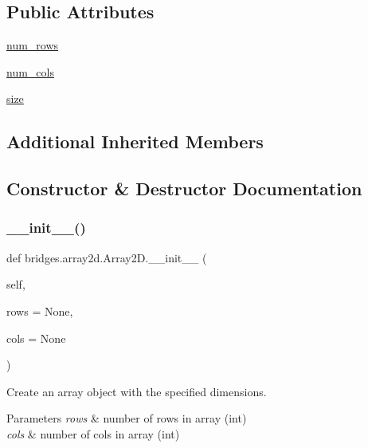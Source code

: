 \subsection*{Public Attributes}
\begin{DoxyCompactItemize}
\item 
\hyperlink{classbridges_1_1array2d_1_1_array2_d_a45ad2f76ebf188ea726f7b573282cc5a}{num\+\_\+rows}
\item 
\hyperlink{classbridges_1_1array2d_1_1_array2_d_ab141dadc82b84fe9fae4bfbd664521b0}{num\+\_\+cols}
\item 
\hyperlink{classbridges_1_1array2d_1_1_array2_d_aabdeff1615fd9909c8d0a75488e40290}{size}
\end{DoxyCompactItemize}
\subsection*{Additional Inherited Members}


\subsection{Constructor \& Destructor Documentation}
\mbox{\label{classbridges_1_1array2d_1_1_array2_d_a8e55f66ed3e8b4f9dd0a6eac578d8c07}} 
\subsubsection{\texorpdfstring{\+\_\+\+\_\+init\+\_\+\+\_\+()}{\_\_init\_\_()}}
{\footnotesize\ttfamily def bridges.\+array2d.\+Array2\+D.\+\_\+\+\_\+init\+\_\+\+\_\+ (\begin{DoxyParamCaption}\item[{}]{self,  }\item[{}]{rows = {\ttfamily None},  }\item[{}]{cols = {\ttfamily None} }\end{DoxyParamCaption})}



Create an array object with the specified dimensions. 


\begin{DoxyParams}{Parameters}
{\em rows} & number of rows in array (int) \\
\hline
{\em cols} & number of cols in array (int) \\
\hline
\end{DoxyParams}


